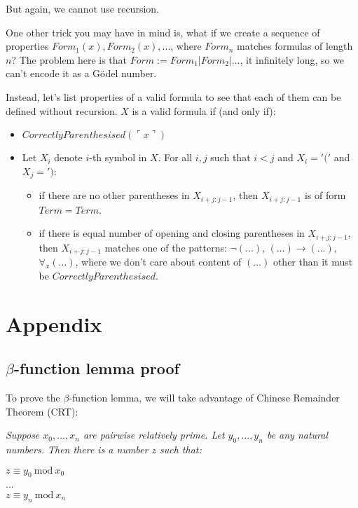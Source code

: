 \documentclass{article}
\begin{document}
But again, we cannot use recursion.

One other trick you may have in mind is, what if we create a sequence of properties
$Form_1(x), Form_2(x), ...$, where $Form_n$ matches formulas of length $n$? The problem here is that
$Form := Form_1 | Form_2 | ...$, it infinitely long, so we can't encode it as a Gödel number.

Instead, let's list properties of a valid formula to see that each of them can be defined without
recursion.
$X$ is a valid formula if (and only if):
\begin{itemize}
    \item $CorrectlyParenthesised(\ulcorner x \urcorner)$
    \item Let $X_i$ denote $i$-th symbol in $X$. For all $i, j$ such that $i < j$ and $X_i = '('$
        and $X_j = ')$:
        \begin{itemize}
            \item if there are no other parentheses in $X_{i + j : j - 1}$, then $X_{i + j : j - 1}$
                is of form $Term = Term$.
            \item if there is equal number of opening and closing parentheses in $X_{i + j : j - 1}$,
                then $X_{i + j : j - 1}$ matches one of the patterns: $\neg (...)$, $(...) \rightarrow (...)$,
                $\forall_x (...)$, where we don't care about content of $(...)$ other than it must be
                $CorrectlyParenthesised$.
        \end{itemize}
\end{itemize}

\section{Appendix}

\subsection{$\beta$-function lemma proof}

To prove the $\beta$-function lemma, we will take advantage of Chinese Remainder Theorem (CRT):

\begin{center}
    \textit{
        Suppose $x_0, ..., x_n$ are pairwise relatively prime. Let $y_0, ..., y_n$ be any natural numbers.
        Then there is a number $z$ such that:
    }

    $z \equiv y_0\ \text{mod}\ x_0$\\
    ...\\
    $z \equiv y_n\ \text{mod}\ x_n$
\end{center}
\end{document}
